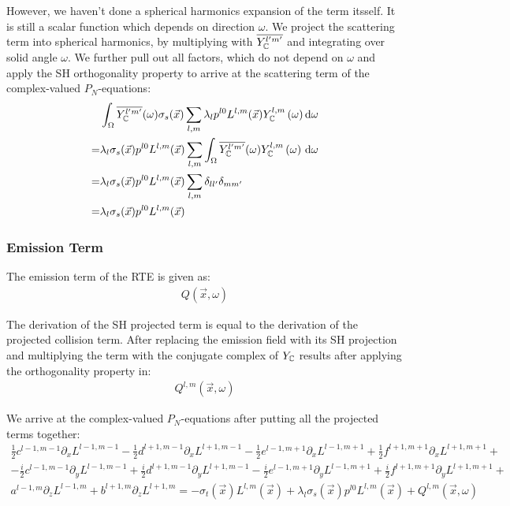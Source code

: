 \documentclass[10pt]{scrartcl}
\begin{document}
However, we haven't done a spherical harmonics expansion of the term itsself. It is still a scalar function which depends on direction $\omega$. We project the scattering term into spherical harmonics, by multiplying with $\overline {Y_{\mathbb{C}}^{l'm'}}$ and integrating over solid angle $\omega$. We further pull out all factors, which do not depend on $\omega$ and apply the SH orthogonality property to arrive at the scattering term of the complex-valued $P_N$-equations:
\begin{align}
&
\int_{\Omega}
{
\overline{Y_{\mathbb{C}}^{l'm'}}(\omega)
\sigma_s(\vec{x})
\sum_{l,m}
{
\lambda_l
p^{l0}L^{l,m}(\vec{x})
Y_{\mathbb{C}}^{l,m}\left(\omega\right)
}
\,\mathrm{d}\omega
}
\nonumber\\
=&
\lambda_l
\sigma_s(\vec{x})
p^{l0}L^{l,m}(\vec{x})
\sum_{l,m}
{
\int_{\Omega}
{
\overline{Y_{\mathbb{C}}^{l'm'}}(\omega)
Y_{\mathbb{C}}^{l,m}\left(\omega\right)
\,\mathrm{d}\omega
}
}
\nonumber\\
=&
\lambda_l
\sigma_s(\vec{x})
p^{l0}L^{l,m}(\vec{x})
\sum_{l,m}
{
\delta_{ll'}\delta_{mm'}
}
\nonumber\\
=&
\lambda_l
\sigma_s(\vec{x})
p^{l0}L^{l,m}(\vec{x})
\end{align}

\subsubsection{Emission Term}

The emission term of the RTE is given as:
\begin{align}
Q\left(\vec{x}, \omega\right)
\end{align}

The derivation of the SH projected term is equal to the derivation of the projected collision term. After replacing the emission field with its SH projection and multiplying the term with the conjugate complex of $Y_{\mathbb{C}}$ results after applying the orthogonality property in:
\begin{align}
Q^{l,m}\left(\vec{x}, \omega\right)
\end{align}

We arrive at the complex-valued $P_N$-equations after putting all the projected terms together:
\begin{align*}
\frac{1}{2}c^{l-1, m-1}\partial_x L^{l-1,m-1} - \frac{1}{2}d^{l+1, m-1}\partial_x L^{l+1,m-1} - \frac{1}{2}e^{l-1, m+1}\partial_x L^{l-1,m+1} + \frac{1}{2}f^{l+1, m+1}\partial_x L^{l+1,m+1}+
\\
-\frac{i}{2}c^{l-1, m-1}\partial_y L^{l-1,m-1} + \frac{i}{2}d^{l+1, m-1}\partial_y L^{l+1,m-1} - \frac{i}{2}e^{l-1, m+1}\partial_y L^{l-1,m+1} + \frac{i}{2}f^{l+1, m+1}\partial_y L^{l+1,m+1}+
\\
a^{l-1, m}\partial_z L^{l-1,m}+b^{l+1, m}\partial_z L^{l+1,m}
=
-\sigma_t\left(\vec{x}\right)L^{l,m}\left(\vec{x}\right )
+
\lambda_l
\sigma_s(\vec{x})
p^{l0}L^{l,m}(\vec{x}) + Q^{l,m}\left(\vec{x}, \omega\right)
\end{align*}
\end{document}
